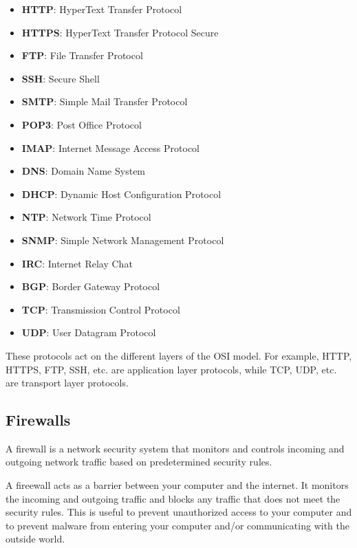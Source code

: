 \begin{itemize}
    \item \textbf{HTTP}: HyperText Transfer Protocol
    \item \textbf{HTTPS}: HyperText Transfer Protocol Secure
    \item \textbf{FTP}: File Transfer Protocol
    \item \textbf{SSH}: Secure Shell
    \item \textbf{SMTP}: Simple Mail Transfer Protocol
    \item \textbf{POP3}: Post Office Protocol
    \item \textbf{IMAP}: Internet Message Access Protocol
    \item \textbf{DNS}: Domain Name System
    \item \textbf{DHCP}: Dynamic Host Configuration Protocol
    \item \textbf{NTP}: Network Time Protocol
    \item \textbf{SNMP}: Simple Network Management Protocol
    \item \textbf{IRC}: Internet Relay Chat
    \item \textbf{BGP}: Border Gateway Protocol
    \item \textbf{TCP}: Transmission Control Protocol
    \item \textbf{UDP}: User Datagram Protocol
\end{itemize}

These protocols act on the different layers of the
OSI model. For example, HTTP, HTTPS, FTP, SSH, etc.
are application layer protocols, while TCP, UDP, etc.
are transport layer protocols.

\subsection{Firewalls}

\begin{definition}[Firewall]
  A firewall is a network security system that monitors
  and controls incoming and outgoing network traffic
  based on predetermined security rules.
\end{definition}

A fireewall acts as a barrier between your computer
and the internet. It monitors the incoming and outgoing
traffic and blocks any traffic that does not meet the
security rules. This is useful to prevent unauthorized
access to your computer and to prevent malware from
entering your computer and/or communicating with the
outside world.

